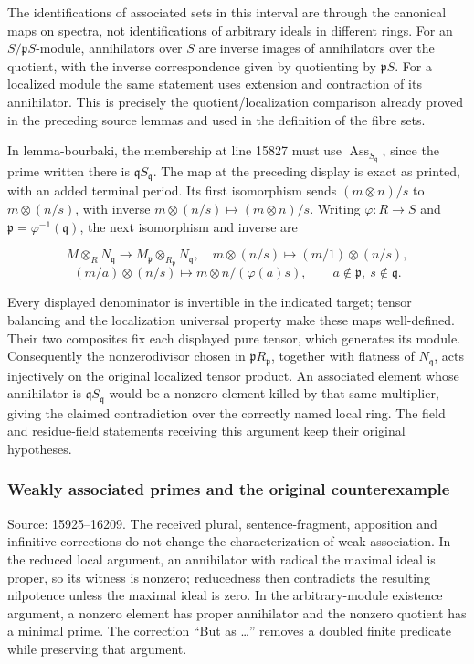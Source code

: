 The identifications of associated sets in this interval are through the canonical maps on spectra, not identifications of arbitrary ideals in different rings. For an \(S/\mathfrak pS\)-module, annihilators over \(S\) are inverse images of annihilators over the quotient, with the inverse correspondence given by quotienting by \(\mathfrak pS\). For a localized module the same statement uses extension and contraction of its annihilator. This is precisely the quotient/localization comparison already proved in the preceding source lemmas and used in the definition of the fibre sets.

In lemma-bourbaki, the membership at line 15827 must use \(\operatorname{Ass}_{S_{\mathfrak q}}\), since the prime written there is \(\mathfrak qS_{\mathfrak q}\). The map at the preceding display is exact as printed, with an added terminal period. Its first isomorphism sends \((m\otimes n)/s\) to \(m\otimes(n/s)\), with inverse \(m\otimes(n/s)\mapsto(m\otimes n)/s\). Writing \(\varphi:R\to S\) and \(\mathfrak p=\varphi^{-1}(\mathfrak q)\), the next isomorphism and inverse are

\[
M\otimes_RN_{\mathfrak q}\longrightarrow
 M_{\mathfrak p}\otimes_{R_{\mathfrak p}}N_{\mathfrak q},
\quad m\otimes(n/s)\longmapsto(m/1)\otimes(n/s),
\] \[
(m/a)\otimes(n/s)\longmapsto m\otimes n/(\varphi(a)s),
\qquad a\notin\mathfrak p,\ s\notin\mathfrak q.
\]

Every displayed denominator is invertible in the indicated target; tensor balancing and the localization universal property make these maps well-defined. Their two composites fix each displayed pure tensor, which generates its module. Consequently the nonzerodivisor chosen in \(\mathfrak pR_{\mathfrak p}\), together with flatness of \(N_{\mathfrak q}\), acts injectively on the original localized tensor product. An associated element whose annihilator is \(\mathfrak qS_{\mathfrak q}\) would be a nonzero element killed by that same multiplier, giving the claimed contradiction over the correctly named local ring. The field and residue-field statements receiving this argument keep their original hypotheses.

\subsubsection{Weakly associated primes and the original counterexample}\label{algebra-proof-005-weakly-associated-primes-and-the-original-counterexample}

Source: 15925--16209. The received plural, sentence-fragment, apposition and infinitive corrections do not change the characterization of weak association. In the reduced local argument, an annihilator with radical the maximal ideal is proper, so its witness is nonzero; reducedness then contradicts the resulting nilpotence unless the maximal ideal is zero. In the arbitrary-module existence argument, a nonzero element has proper annihilator and the nonzero quotient has a minimal prime. The correction ``But as \ldots'' removes a doubled finite predicate while preserving that argument.

